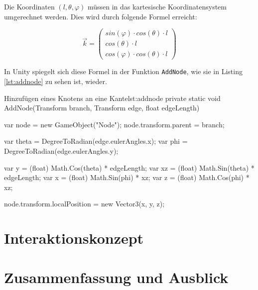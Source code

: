 Die Koordinaten $(l, \theta, \varphi)$ müssen in das kartesische Koordinatensystem umgerechnet werden. Dies wird durch folgende Formel erreicht:

\begin{equation}
  \vec{k} = 
  \begin{pmatrix}
    sin(\varphi) \cdot cos(\theta) \cdot l\\
    cos(\theta) \cdot l\\
    cos(\varphi) \cdot cos(\theta) \cdot l
  \end{pmatrix}
\end{equation}


In Unity spiegelt sich diese Formel in der Funktion \texttt{AddNode}, wie sie in Listing \ref{lst:addnode} zu sehen ist, wieder.

\begin{codesnippet}{Hinzufügen eines Knotens an eine Kante}{lst:addnode}
private static void AddNode(Transform branch, 
                            Transform edge, 
                            float edgeLength)
{
    var node = new GameObject("Node");
    node.transform.parent = branch;

    var theta = DegreeToRadian(edge.eulerAngles.x);
    var phi = DegreeToRadian(edge.eulerAngles.y);

    var y = (float) Math.Cos(theta) * edgeLength;
    var xz = (float) Math.Sin(theta) * edgeLength;
    var x = (float) Math.Sin(phi) * xz;
    var z = (float) Math.Cos(phi) * xz;

    node.transform.localPosition = new Vector3(x, y, z);
}
\end{codesnippet} 

% 

\chapter{Interaktionskonzept}
\label{ch:interaction}
\chapter{Zusammenfassung und Ausblick}
\label{ch:conclusion}
		